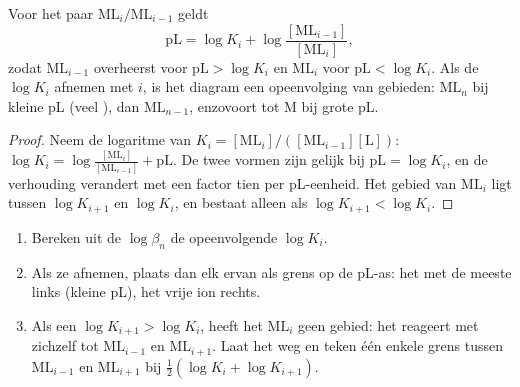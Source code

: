 \begin{proposition}[Grenzen in pL]\label{prop:b1:complexation:pl-boundaries}
Voor het paar $\mathrm{ML}_i/\mathrm{ML}_{i-1}$ geldt
\[
  \mathrm{pL} = \log K_i + \log\frac{[\mathrm{ML}_{i-1}]}{[\mathrm{ML}_i]} ,
\]
zodat $\mathrm{ML}_{i-1}$ overheerst voor $\mathrm{pL} > \log K_i$ en
$\mathrm{ML}_i$ voor $\mathrm{pL} < \log K_i$. Als de $\log K_i$ afnemen
met $i$, is het diagram een opeenvolging van gebieden: $\mathrm{ML}_n$
bij kleine pL (veel ), dan $\mathrm{ML}_{n-1}$, enzovoort tot M bij
grote pL.
\end{proposition}

\begin{proof}
Neem de logaritme van $K_i = [\mathrm{ML}_i]/([\mathrm{ML}_{i-1}][\mathrm{L}])$:
$\log K_i = \log\frac{[\mathrm{ML}_i]}{[\mathrm{ML}_{i-1}]} + \mathrm{pL}$.
De twee vormen zijn gelijk bij $\mathrm{pL} = \log K_i$, en de
verhouding verandert met een factor tien per pL-eenheid. Het gebied van
$\mathrm{ML}_i$ ligt tussen
$\log K_{i+1}$ en $\log K_i$, en bestaat alleen als $\log K_{i+1} < \log
K_i$.
\end{proof}

\begin{method}\label{met:b1:complexation:pl-diagram}
\begin{enumerate}
  \item Bereken uit de $\log\beta_n$ de opeenvolgende $\log K_i$.
  \item Als ze afnemen, plaats dan elk ervan als grens op de pL-as: het
         met de meeste  links (kleine pL), het vrije ion
        rechts.
  \item Als een $\log K_{i+1} > \log K_i$, heeft het 
        $\mathrm{ML}_i$ geen gebied: het reageert met zichzelf tot
        $\mathrm{ML}_{i-1}$ en $\mathrm{ML}_{i+1}$. Laat het weg en teken
        één enkele grens tussen $\mathrm{ML}_{i-1}$ en $\mathrm{ML}_{i+1}$
        bij $\frac12(\log K_i + \log K_{i+1})$.
\end{enumerate}
\end{method}

